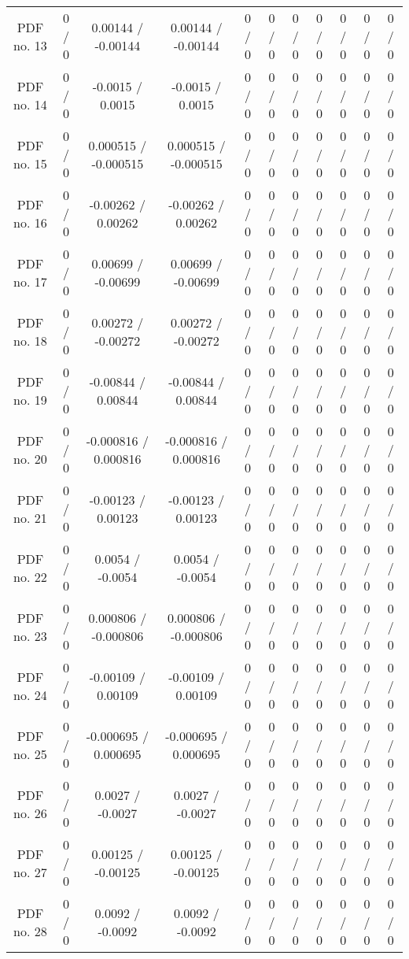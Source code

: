 \begin{table}[htbp]
\begin{center}
\begin{tabular}{|c|c|c|c|c|c|c|c|c|c|c|}
  PDF no. 13 & 0 / 0 & 0.00144 / -0.00144 & 0.00144 / -0.00144 & 0 / 0 & 0 / 0 & 0 / 0 & 0 / 0 & 0 / 0 & 0 / 0 & 0 / 0 \\ 
  PDF no. 14 & 0 / 0 & -0.0015 / 0.0015 & -0.0015 / 0.0015 & 0 / 0 & 0 / 0 & 0 / 0 & 0 / 0 & 0 / 0 & 0 / 0 & 0 / 0 \\ 
  PDF no. 15 & 0 / 0 & 0.000515 / -0.000515 & 0.000515 / -0.000515 & 0 / 0 & 0 / 0 & 0 / 0 & 0 / 0 & 0 / 0 & 0 / 0 & 0 / 0 \\ 
  PDF no. 16 & 0 / 0 & -0.00262 / 0.00262 & -0.00262 / 0.00262 & 0 / 0 & 0 / 0 & 0 / 0 & 0 / 0 & 0 / 0 & 0 / 0 & 0 / 0 \\ 
  PDF no. 17 & 0 / 0 & 0.00699 / -0.00699 & 0.00699 / -0.00699 & 0 / 0 & 0 / 0 & 0 / 0 & 0 / 0 & 0 / 0 & 0 / 0 & 0 / 0 \\ 
  PDF no. 18 & 0 / 0 & 0.00272 / -0.00272 & 0.00272 / -0.00272 & 0 / 0 & 0 / 0 & 0 / 0 & 0 / 0 & 0 / 0 & 0 / 0 & 0 / 0 \\ 
  PDF no. 19 & 0 / 0 & -0.00844 / 0.00844 & -0.00844 / 0.00844 & 0 / 0 & 0 / 0 & 0 / 0 & 0 / 0 & 0 / 0 & 0 / 0 & 0 / 0 \\ 
  PDF no. 20 & 0 / 0 & -0.000816 / 0.000816 & -0.000816 / 0.000816 & 0 / 0 & 0 / 0 & 0 / 0 & 0 / 0 & 0 / 0 & 0 / 0 & 0 / 0 \\ 
  PDF no. 21 & 0 / 0 & -0.00123 / 0.00123 & -0.00123 / 0.00123 & 0 / 0 & 0 / 0 & 0 / 0 & 0 / 0 & 0 / 0 & 0 / 0 & 0 / 0 \\ 
  PDF no. 22 & 0 / 0 & 0.0054 / -0.0054 & 0.0054 / -0.0054 & 0 / 0 & 0 / 0 & 0 / 0 & 0 / 0 & 0 / 0 & 0 / 0 & 0 / 0 \\ 
  PDF no. 23 & 0 / 0 & 0.000806 / -0.000806 & 0.000806 / -0.000806 & 0 / 0 & 0 / 0 & 0 / 0 & 0 / 0 & 0 / 0 & 0 / 0 & 0 / 0 \\ 
  PDF no. 24 & 0 / 0 & -0.00109 / 0.00109 & -0.00109 / 0.00109 & 0 / 0 & 0 / 0 & 0 / 0 & 0 / 0 & 0 / 0 & 0 / 0 & 0 / 0 \\ 
  PDF no. 25 & 0 / 0 & -0.000695 / 0.000695 & -0.000695 / 0.000695 & 0 / 0 & 0 / 0 & 0 / 0 & 0 / 0 & 0 / 0 & 0 / 0 & 0 / 0 \\ 
  PDF no. 26 & 0 / 0 & 0.0027 / -0.0027 & 0.0027 / -0.0027 & 0 / 0 & 0 / 0 & 0 / 0 & 0 / 0 & 0 / 0 & 0 / 0 & 0 / 0 \\ 
  PDF no. 27 & 0 / 0 & 0.00125 / -0.00125 & 0.00125 / -0.00125 & 0 / 0 & 0 / 0 & 0 / 0 & 0 / 0 & 0 / 0 & 0 / 0 & 0 / 0 \\ 
  PDF no. 28 & 0 / 0 & 0.0092 / -0.0092 & 0.0092 / -0.0092 & 0 / 0 & 0 / 0 & 0 / 0 & 0 / 0 & 0 / 0 & 0 / 0 & 0 / 0 \\ 

\end{tabular}
\end{center}
\end{table}

